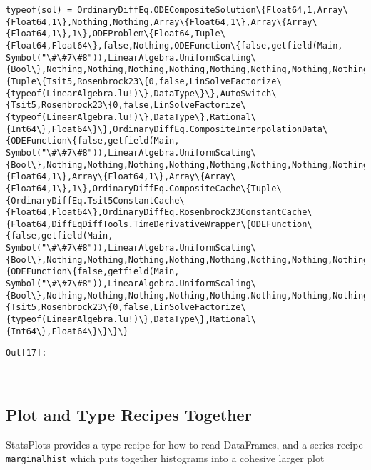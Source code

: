 \documentclass[11pt]{article}
\begin{document}
    \begin{Verbatim}[commandchars=\\\{\}]
typeof(sol) = OrdinaryDiffEq.ODECompositeSolution\{Float64,1,Array\{Float64,1\},Nothing,Nothing,Array\{Float64,1\},Array\{Array\{Float64,1\},1\},ODEProblem\{Float64,Tuple\{Float64,Float64\},false,Nothing,ODEFunction\{false,getfield(Main, Symbol("\#\#7\#8")),LinearAlgebra.UniformScaling\{Bool\},Nothing,Nothing,Nothing,Nothing,Nothing,Nothing,Nothing,Nothing\},Nothing,DiffEqBase.StandardODEProblem\},CompositeAlgorithm\{Tuple\{Tsit5,Rosenbrock23\{0,false,LinSolveFactorize\{typeof(LinearAlgebra.lu!)\},DataType\}\},AutoSwitch\{Tsit5,Rosenbrock23\{0,false,LinSolveFactorize\{typeof(LinearAlgebra.lu!)\},DataType\},Rational\{Int64\},Float64\}\},OrdinaryDiffEq.CompositeInterpolationData\{ODEFunction\{false,getfield(Main, Symbol("\#\#7\#8")),LinearAlgebra.UniformScaling\{Bool\},Nothing,Nothing,Nothing,Nothing,Nothing,Nothing,Nothing,Nothing\},Array\{Float64,1\},Array\{Float64,1\},Array\{Array\{Float64,1\},1\},OrdinaryDiffEq.CompositeCache\{Tuple\{OrdinaryDiffEq.Tsit5ConstantCache\{Float64,Float64\},OrdinaryDiffEq.Rosenbrock23ConstantCache\{Float64,DiffEqDiffTools.TimeDerivativeWrapper\{ODEFunction\{false,getfield(Main, Symbol("\#\#7\#8")),LinearAlgebra.UniformScaling\{Bool\},Nothing,Nothing,Nothing,Nothing,Nothing,Nothing,Nothing,Nothing\},Float64,Nothing\},DiffEqDiffTools.UDerivativeWrapper\{ODEFunction\{false,getfield(Main, Symbol("\#\#7\#8")),LinearAlgebra.UniformScaling\{Bool\},Nothing,Nothing,Nothing,Nothing,Nothing,Nothing,Nothing,Nothing\},Float64,Nothing\}\}\},AutoSwitch\{Tsit5,Rosenbrock23\{0,false,LinSolveFactorize\{typeof(LinearAlgebra.lu!)\},DataType\},Rational\{Int64\},Float64\}\}\}\}

    \end{Verbatim}
\texttt{\color{outcolor}Out[{\color{outcolor}17}]:}
    
    \begin{center}
    \end{center}
    { \hspace*{\fill} \\}
    

    \subsection{Plot and Type Recipes
Together}\label{plot-and-type-recipes-together}

StatsPlots provides a type recipe for how to read DataFrames, and a
series recipe \texttt{marginalhist} which puts together histograms into
a cohesive larger plot
\end{document}
